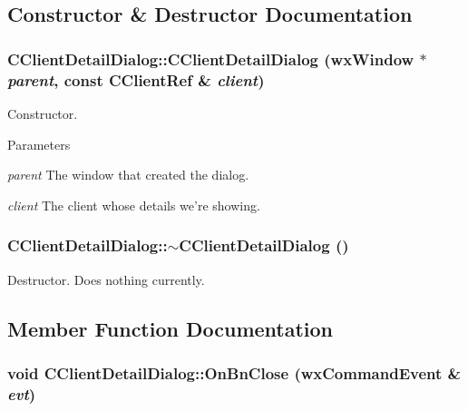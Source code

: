 \subsection{Constructor \& Destructor Documentation}
\subsubsection[{CClientDetailDialog}]{\setlength{\rightskip}{0pt plus 5cm}CClientDetailDialog::CClientDetailDialog (wxWindow $\ast$ {\em parent}, \/  const {\bf CClientRef} \& {\em client})}\label{classCClientDetailDialog_afe0a198e8d11fc8ee989b5228696ac88}


Constructor. 
\begin{DoxyParams}{Parameters}
\item[{\em parent}]The window that created the dialog. \item[{\em client}]The client whose details we're showing. \end{DoxyParams}
\subsubsection[{$\sim$CClientDetailDialog}]{\setlength{\rightskip}{0pt plus 5cm}CClientDetailDialog::$\sim$CClientDetailDialog ()\hspace{0.3cm}{\ttfamily  [virtual]}}\label{classCClientDetailDialog_ac1e10f1f66b43cccd83182b1acd38c8c}


Destructor. Does nothing currently. 

\subsection{Member Function Documentation}
\subsubsection[{OnBnClose}]{\setlength{\rightskip}{0pt plus 5cm}void CClientDetailDialog::OnBnClose (wxCommandEvent \& {\em evt})\hspace{0.3cm}{\ttfamily  [protected]}}\label{classCClientDetailDialog_a49ad952d3cf4b0f35bdf65092a316c0a}



